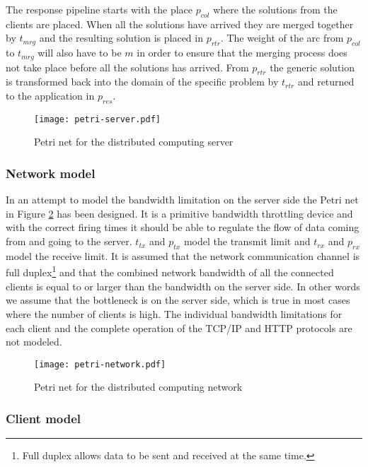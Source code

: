 The response pipeline starts with the place $p_{col}$ where the solutions from the clients are placed.
When all the solutions have arrived they are merged together by $t_{mrg}$ and the resulting solution is placed in $p_{rtr}$.
The weight of the arc from $p_{col}$ to $t_{mrg}$ will also have to be $m$ in order to ensure that the merging process does not take place before all the solutions has arrived.
From $p_{rtr}$ the generic solution is transformed back into the domain of the specific problem by $t_{rtr}$ and returned to the application in $p_{res}$.

\begin{figure}[tbp]
	\centering 
	\texttt{[image: petri-server.pdf]}
	\caption{Petri net for the distributed computing server}
	\label{fig:petri-server}
\end{figure}


\subsubsection{Network model}

In an attempt to model the bandwidth limitation on the server side the Petri net in Figure \ref{fig:petri-network} has been designed.
It is a primitive bandwidth throttling device and with the correct firing times it should be able to regulate the flow of data coming from and going to the server.
$t_{tx}$ and $p_{tx}$ model the transmit limit and $t_{rx}$ and $p_{rx}$ model the receive limit.
It is assumed that the network communication channel is full duplex\footnote{Full duplex allows data to be sent and received at the same time.} and that the combined network bandwidth of all the connected clients is equal to or larger than the bandwidth on the server side.
In other words we assume that the bottleneck is on the server side, which is true in most cases where the number of clients is high.
The individual bandwidth limitations for each client and the complete operation of the TCP/IP and HTTP protocols are not modeled.

\begin{figure}[tbp]
	\centering 
	\texttt{[image: petri-network.pdf]}
	\caption{Petri net for the distributed computing network}
	\label{fig:petri-network}
\end{figure}


\subsubsection{Client model}

